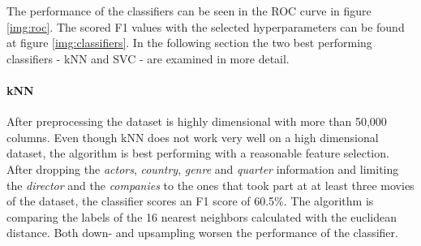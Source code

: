 The performance of the classifiers can be seen in the ROC curve in figure \ref{img:roc}. The scored F1 values with the selected hyperparameters can be found at figure \ref{img:classifiers}.
In the following section the two best performing classifiers - kNN and SVC - are examined in more detail.


\paragraph{kNN}
After preprocessing the dataset is highly dimensional with more than 50,000 columns. Even though kNN does not work very well on a high dimensional dataset, the algorithm is best performing with a reasonable feature selection. After dropping the \textit{actors}, \textit{country}, \textit{genre} and \textit{quarter} information and limiting the \textit{director} and the \textit{companies} to the ones that took part at at least three movies of the dataset, the classifier scores an F1 score of 60.5\%. The algorithm is comparing the labels of the 16 nearest neighbors calculated with the euclidean distance. Both down- and upsampling worsen the performance of the classifier. 
